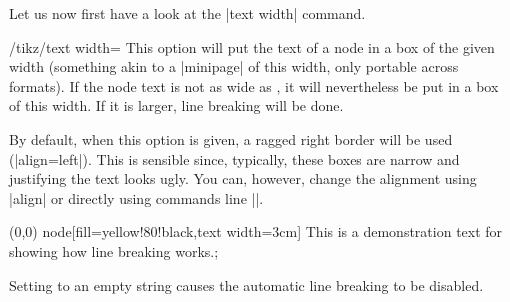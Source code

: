 Let us now first have a look at the |text width| command.
\begin{key}{/tikz/text width=}
    This option will put the text of a node in a box of the given width
    (something akin to a |{minipage}| of this width, only portable across
    formats). If the node text is not as wide as , it will
    nevertheless be put in a box of this width. If it is larger, line breaking
    will be done.

    By default, when this option is given, a ragged right border will be used
    (|align=left|). This is sensible since, typically, these boxes are narrow
    and justifying the text looks ugly. You can, however, change the alignment
    using |align| or directly using commands line |\centering|.
\begin{codeexample}[]
\tikz \draw (0,0) node[fill=yellow!80!black,text width=3cm]
  {This is a demonstration text for showing how line breaking works.};
\end{codeexample}
    Setting  to an empty string causes the automatic line
    breaking to be disabled.
\end{key}

